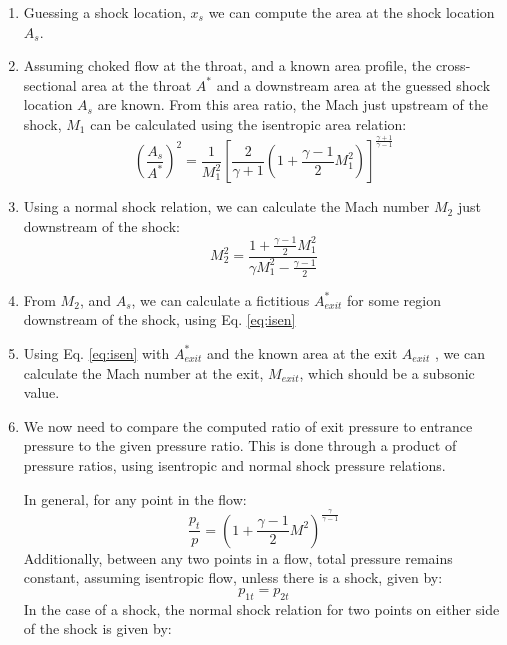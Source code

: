 \documentclass{article}%
\numberwithin{equation}{section}
\begin{document}
\begin{enumerate}
\item Guessing a shock location, $ x_s $ we can compute the area at the shock location $ A_s $.
\item 
Assuming choked flow at the throat, and a known area profile, the cross-sectional area at the throat $ A^* $ and a downstream area at the guessed shock location $ A_s $ are known. From this area ratio, the Mach just upstream of the shock, $ M_1 $ can be calculated using the isentropic area relation:
\begin{equation} \label{eq:isen}
\left( \frac{A_s}{A^*}\right)^2=\frac{1}{M_1^2} \left[ \frac{2}{\gamma +1} \left(1+\frac{\gamma-1}{2} M_1^2 \right) \right]^{\frac{\gamma+1}{\gamma-1}}
\end{equation}

\item Using a normal shock relation, we can calculate the Mach number $ M_2 $ just downstream of the shock:
\begin{equation}
M_2^2=\frac{1+\frac{\gamma-1}{2}M_1^2}{\gamma M_1^2-\frac{\gamma-1}{2}}
\end{equation}


\item From $ M_2 $, and $ A_s $, we can calculate a fictitious $ A^*_{exit} $ for some region downstream of the shock, using Eq. \ref{eq:isen}

\item Using Eq. \ref{eq:isen} with $ A^*_{exit} $ and the known area at the exit $ A_{exit} $ , we can calculate the Mach number at the exit, $ M_{exit} $, which should be a subsonic value.

\item We now need to compare the computed ratio of exit pressure to entrance pressure to the given pressure ratio. This is done through a product of pressure ratios, using isentropic and normal shock pressure relations.

In general, for any point in the flow:
\begin{equation} \label{eq:pt}
\frac{p_t}{p}=\left(1+\frac{\gamma-1}{2}M^2\right)^{\frac{\gamma}{\gamma-1}}
\end{equation}
Additionally, between any two points in a flow, total pressure remains constant, assuming isentropic flow, unless there is a shock, given by:
\begin{equation}
p_{1t}=p_{2t}
\end{equation}
In the case of a shock, the normal shock relation for two points on either side of the shock is given by:


\end{enumerate}
\end{document}
